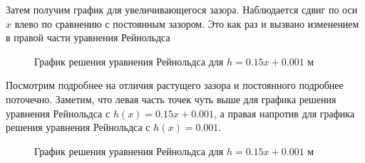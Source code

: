 \documentclass[a4paper,14pt]{extarticle}
\begin{document}
Затем получим график для увеличивающегося зазора. Наблюдается сдвиг по оси $x$ влево по сравнению с постоянным зазором. Это как раз и вызвано изменением в правой части уравнения Рейнольдса
\begin{figure}[!htbp]
	\caption{График решения уравнения Рейнольдса для $h = 0.15 x + 0.001$ м}
	\label{res_pos}
\end{figure}

\newpage

Посмотрим подробнее на отличия растущего зазора и постоянного подробнее поточечно. Заметим, что левая часть точек чуть выше для графика решения уравнения Рейнольдса с  $h(x) = 0.15x + 0.001$, а правая напротив для графика решения уравнения Рейнольдса с $h(x) = 0.001$.

\begin{figure}[!htbp]
	\caption{График решения уравнения Рейнольдса для $h = 0.15 x + 0.001$ м}
	\label{pos_res_diff}
\end{figure}
\end{document}
